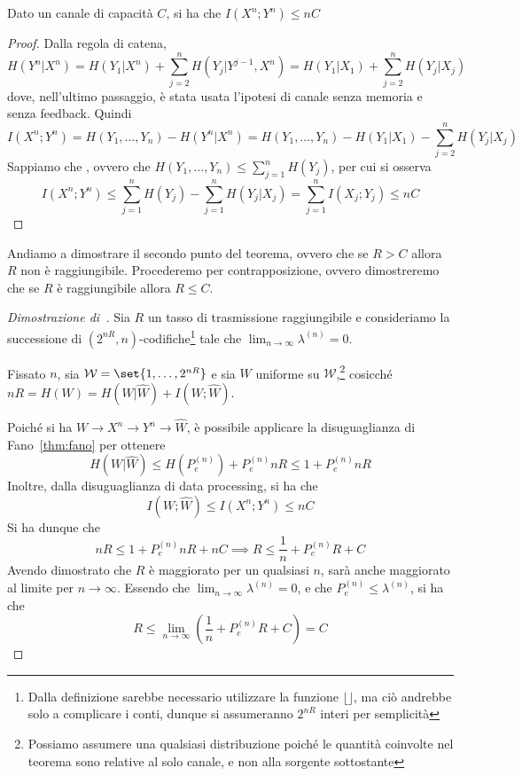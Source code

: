 \begin{lemma}{}
  Dato un canale di capacità \(C\), si ha che
  \(I(X^n;Y^n)\leq n C\)
\end{lemma}
\begin{proof}
  Dalla regola di catena,
  \[H(Y^n|X^n) = H(Y_1|X^n) + \sum_{j=2}^n H(Y_j|Y^{j-1},X^n) = H(Y_1|X_1) + \sum_{j=2}^n H(Y_j|X_j)\]
  dove, nell'ultimo passaggio, è stata usata l'ipotesi di canale senza memoria e senza feedback.
  Quindi
  \[I(X^n;Y^n) = H(Y_1,\ldots,Y_n) - H(Y^n|X^n) = H(Y_1, \ldots, Y_n) - H(Y_1|X_1) - \sum_{j=2}^n H(Y_j|X_j)\]
  Sappiamo che , ovvero che \(H(Y_1,\ldots, Y_n) \leq \sum_{j=1}^n H(Y_j)\), per cui si osserva
  \[I(X^n;Y^n) \leq \sum_{j=1}^n H(Y_j) - \sum_{j=1}^n H(Y_j|X_j) = \sum_{j=1}^n I(X_j;Y_j) \leq n C\]
  
\end{proof}

Andiamo a dimostrare il secondo punto del teorema, ovvero che se \(R>C\) allora \(R\) non è raggiungibile.
Procederemo per contrapposizione, ovvero dimostreremo che se \(R\) è raggiungibile allora \(R\leq C\).

\begin{proof}[Dimostrazione di~]
  Sia \(R\) un tasso di trasmissione raggiungibile e consideriamo la successione di \(( 2^{nR},n)\)-codifiche\footnote{Dalla definizione sarebbe necessario utilizzare la funzione \(\lfloor\rfloor\), ma ciò andrebbe solo a complicare i conti, dunque si assumeranno \(2^{nR}\) interi per semplicità} tale che \(\lim_{n\to\infty} \lambda^{(n)} = 0\).
  
  Fissato \(n\), sia \(\mathcal{W} = \set{1, \ldots, 2^{nR}}\) e sia \(W\) uniforme su \(\mathcal{W}\),\footnote{Possiamo assumere una qualsiasi distribuzione poiché le quantità coinvolte nel teorema sono relative al solo canale, e non alla sorgente sottostante}
  cosicché \(nR = H(W) = H(W|\hat{W}) + I(W;\hat{W})\).

  Poiché si ha \(W \to X^n \to Y^n \to \hat{W}\), è possibile applicare la disuguaglianza di Fano~\ref{thm:fano} per ottenere
  \[H(W|\hat{W}) \leq H(P_e^{(n)}) + P_e^{(n)} nR\leq 1 + P_e^{(n)} nR\]
  Inoltre, dalla disuguaglianza di data processing, si ha che
  \[I(W;\hat{W}) \leq I(X^n;Y^n) \leq n C \]
  Si ha dunque che
  \[nR \leq 1 + P_e^{(n)} nR + n C \implies R \leq \frac{1}{n} + P_e^{(n)} R + C\]
  Avendo dimostrato che \(R\) è maggiorato per un qualsiasi \(n\), sarà anche maggiorato al limite per \(n\to\infty\).
  Essendo che \(\lim_{n\to\infty} \lambda^{(n)} = 0\), e che \(P_e^{(n)} \leq \lambda^{(n)}\), si ha che
  \[R \leq \lim_{n\to\infty} \left(\frac{1}{n} + P_e^{(n)} R + C\right) = C\]
\end{proof}

